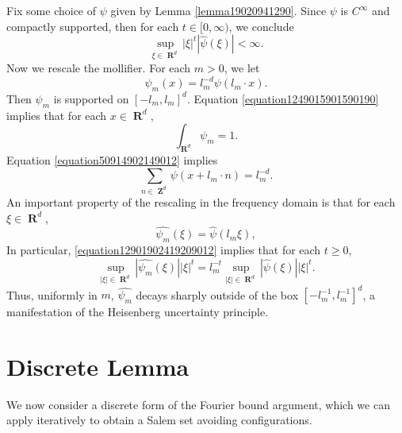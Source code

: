 \documentclass[12pt,reqno]{article}
\DeclareMathOperator{\RR}{\mathbf{R}}
\DeclareMathOperator{\ZZ}{\mathbf{Z}}
\begin{document}
Fix some choice of $\psi$ given by Lemma \ref{lemma19020941290}. Since $\psi$ is $C^\infty$ and compactly supported, then for each $t \in [0,\infty)$, we conclude
%
\begin{equation} \label{equation682928418931289}
	\sup_{\xi \in \RR^d} |\xi|^t |\widehat{\psi}(\xi)| < \infty.
\end{equation}
%
Now we rescale the mollifier. For each $m > 0$, we let
%
\[ \psi_m(x) = l_m^{-d} \psi(l_m \cdot x). \]
%
Then $\psi_m$ is supported on $[-l_m,l_m]^d$. Equation \eqref{equation1249015901590190} implies that for each $x \in \RR^d$,
%
\begin{equation} \label{equation19204910490190190}
	\int_{\RR^d} \psi_m = 1.
\end{equation}
%
Equation \eqref{equation50914902149012} implies
%
\begin{equation} \label{equation990249012409129041290} \sum_{n \in \ZZ^d} \psi(x + l_m \cdot n) = l_m^{-d}. \end{equation}
%
An important property of the rescaling in the frequency domain is that for each $\xi \in \RR^d$,
%
\begin{equation} \label{equation12901902419209012}
    \widehat{\psi_m}(\xi) = \widehat{\psi}(l_m \xi),
\end{equation}
%
In particular, \eqref{equation12901902419209012} implies that for each $t \geq 0$,
%
\begin{equation}
    \sup_{|\xi| \in \RR^d} |\widehat{\psi_m}(\xi)| |\xi|^t = l_m^{-t} \sup_{|\xi| \in \RR^d} |\widehat{\psi}(\xi)| |\xi|^t.
\end{equation}
%
Thus, uniformly in $m$, $\widehat{\psi_m}$ decays sharply outside of the box $[-l_m^{-1}, l_m^{-1}]^d$, a manifestation of the Heisenberg uncertainty principle.

\section{Discrete Lemma}

We now consider a discrete form of the Fourier bound argument, which we can apply iteratively to obtain a Salem set avoiding configurations.
\end{document}
